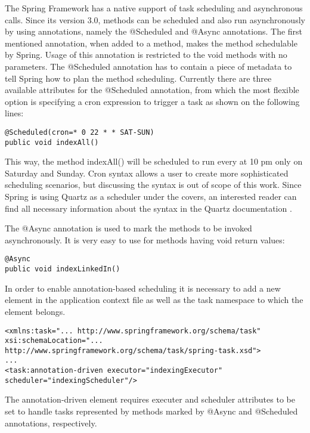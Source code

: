 \documentclass[12pt, oneside, a4paper]{book}
\begin{document}
The Spring Framework has a native support of task scheduling and asynchronous
calls. Since its version 3.0, methods can be scheduled and also run
asynchronously by using annotations, namely the @Scheduled and @Async
annotations. The first mentioned annotation, when added to a method,
makes the method schedulable by Spring. Usage of this annotation is
restricted to the void methods with no parameters. The @Scheduled
annotation has to contain a piece of metadata to tell Spring how to
plan the method scheduling. Currently there are three available attributes
for the @Scheduled annotation, from which the most flexible option
is specifying a cron expression to trigger a task as shown on the
following lines:

\begin{verbatim}
@Scheduled(cron=* 0 22 * * SAT-SUN)
public void indexAll()
\end{verbatim}


This way, the method indexAll() will be scheduled to run every at
10 pm only on Saturday and Sunday. Cron syntax allows a user to create
more sophisticated scheduling scenarios, but discussing the syntax
is out of scope of this work. Since Spring is using Quartz as a scheduler
under the covers, an interested reader can find all necessary information
about the syntax in the Quartz documentation \cite{QuartzDoc}.


The @Async annotation is used to mark the methods to be invoked asynchronously.
It is very easy to use for methods having void return values:

\begin{verbatim}
@Async
public void indexLinkedIn()
\end{verbatim}


In order to enable annotation-based scheduling it is necessary to
add a new element in the application context file as well as the task
namespace to which the element belongs.

\begin{verbatim}
<xmlns:task="... http://www.springframework.org/schema/task" 
xsi:schemaLocation="... http://www.springframework.org/schema/task/spring-task.xsd">
...
<task:annotation-driven executor="indexingExecutor" scheduler="indexingScheduler"/>
\end{verbatim}


The annotation-driven element requires executer and scheduler attributes
to be set to handle tasks represented by methods marked by @Async
and @Scheduled annotations, respectively.
\end{document}
